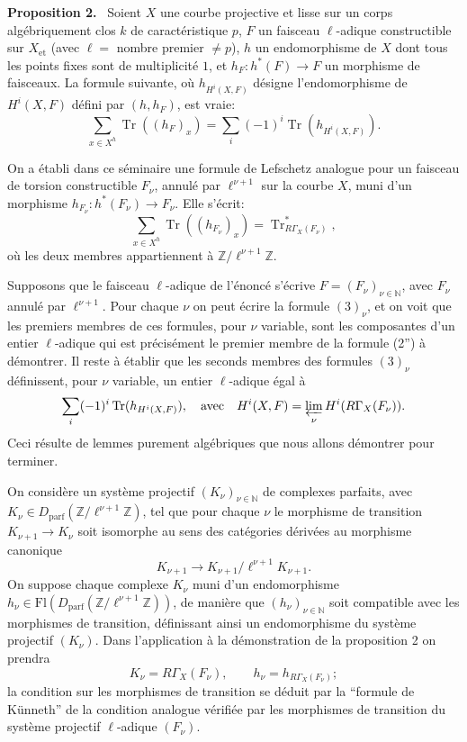 \documentclass[11pt]{article}
\newenvironment{statement}[1]{\par\medskip\noindent\textbf{#1.}\ }{\par\medskip}
\providecommand{\Tr}{\operatorname{Tr}}
\providecommand{\Tr}{\operatorname{Tr}}
\providecommand{\Tr}{\operatorname{Tr}}
\providecommand{\Tr}{\operatorname{Tr}}
\providecommand{\Tr}{\operatorname{Tr}}
\begin{document}
\begin{statement}{Proposition 2}
Soient $X$ une courbe projective et lisse sur un corps algébriquement clos $k$ de caractéristique $p$, $F$ un faisceau $\ell$-adique constructible sur $X_{\mathrm{et}}$ (avec $\ell=$ nombre premier $\ne p$), $h$ un endomorphisme de $X$ dont tous les points fixes sont de multiplicité $1$, et $h_F:h^*(F)\to F$ un morphisme de faisceaux. La formule suivante, où $h_{H^i(X,F)}$ désigne l'endomorphisme de $H^i(X,F)$ défini par $(h,h_F)$, est vraie:
\[
\sum_{x\in X^h}\Tr((h_F)_x)=\sum_i(-1)^i\Tr(h_{H^i(X,F)}).
\tag{2''}
\]
\end{statement}

On a établi dans ce séminaire une formule de Lefschetz analogue pour un faisceau de torsion constructible $F_\nu$, annulé par $\ell^{\nu+1}$ sur la courbe $X$, muni d'un morphisme $h_{F_\nu}:h^*(F_\nu)\to F_\nu$. Elle s'écrit:
\[
\sum_{x\in X^h}\Tr((h_{F_\nu})_x)=\Tr^*_{R\Gamma_X(F_\nu)},
\tag{3}
\]
où les deux membres appartiennent à $\mathbb Z/\ell^{\nu+1}\mathbb Z$.

Supposons que le faisceau $\ell$-adique de l'énoncé s'écrive $F=(F_\nu)_{\nu\in\mathbb N}$, avec $F_\nu$ annulé par $\ell^{\nu+1}$. Pour chaque $\nu$ on peut écrire la formule $(3)_\nu$, et on voit que les premiers membres de ces formules, pour $\nu$ variable, sont les composantes d'un entier $\ell$-adique qui est précisément le premier membre de la formule (2'') à démontrer. Il reste à établir que les seconds membres des formules $(3)_\nu$ définissent, pour $\nu$ variable, un entier $\ell$-adique égal à
\[
\sum_i(-1)^i\Tr(h_{H^i(X,F)}),
\quad\text{avec}\quad
H^i(X,F)=\varprojlim_\nu H^i(R\Gamma_X(F_\nu)).
\]
Ceci résulte de lemmes purement algébriques que nous allons démontrer pour terminer.

On considère un système projectif $(K_\nu)_{\nu\in\mathbb N}$ de complexes parfaits, avec $K_\nu\in D_{\mathrm{parf}}(\mathbb Z/\ell^{\nu+1}\mathbb Z)$, tel que pour chaque $\nu$ le morphisme de transition $K_{\nu+1}\to K_\nu$ soit isomorphe au sens des catégories dérivées au morphisme canonique
\[
K_{\nu+1}\to K_{\nu+1}/\ell^{\nu+1}K_{\nu+1}.
\]
On suppose chaque complexe $K_\nu$ muni d'un endomorphisme $h_\nu\in\mathrm{Fl}(D_{\mathrm{parf}}(\mathbb Z/\ell^{\nu+1}\mathbb Z))$, de manière que $(h_\nu)_{\nu\in\mathbb N}$ soit compatible avec les morphismes de transition, définissant ainsi un endomorphisme du système projectif $(K_\nu)$. Dans l'application à la démonstration de la proposition 2 on prendra
\[
K_\nu=R\Gamma_X(F_\nu),\qquad h_\nu=h_{R\Gamma_X(F_\nu)};
\]
la condition sur les morphismes de transition se déduit par la ``formule de Künneth'' de la condition analogue vérifiée par les morphismes de transition du système projectif $\ell$-adique $(F_\nu)$.
\end{document}
